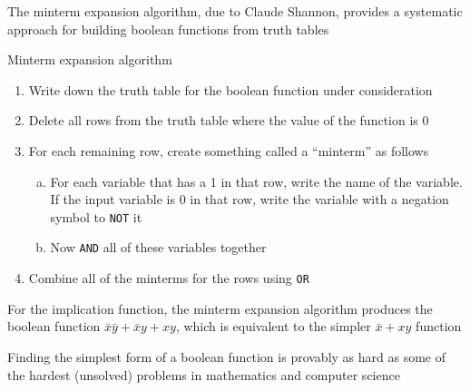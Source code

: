 \documentclass[8pt,a4paper,compress]{beamer}
\begin{document}
\begin{frame}[fragile]
\pause

The minterm expansion algorithm, due to Claude Shannon, provides a systematic approach for building boolean functions from truth tables

\pause
\bigskip

Minterm expansion algorithm
\begin{enumerate}
\item Write down the truth table for the boolean function under consideration

\item Delete all rows from the truth table where the value of the function is 0

\item For each remaining row, create something called a ``minterm'' as follows
\begin{enumerate}[a.]
\item For each variable that has a 1 in that row, write the name of the variable. If the input variable is 0 in that row, write the variable with a negation symbol to \lstinline{NOT} it

\item Now \lstinline{AND} all of these variables together
\end{enumerate}

\item Combine all of the minterms for the rows using \lstinline{OR}
\end{enumerate}

\pause
\bigskip

For the implication function, the minterm expansion algorithm produces the boolean function $\bar{x}\bar{y}+\bar{x}y+xy$, which is equivalent to the simpler $\bar{x}+xy$ function

\pause
\bigskip

Finding the simplest form of a boolean function is provably as hard as some of the hardest (unsolved) problems in mathematics and computer science
\end{frame}
\end{document}
